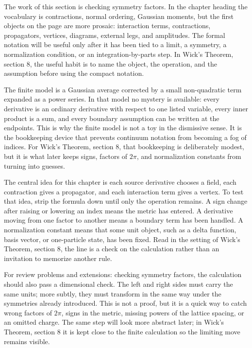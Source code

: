 The work of this section is checking symmetry factors.  In the chapter heading the vocabulary is contractions, normal ordering, Gaussian moments, but the first objects on the page are more prosaic: interaction terms, contractions, propagators, vertices, diagrams, external legs, and amplitudes.  The formal notation will be useful only after it has been tied to a limit, a symmetry, a normalization condition, or an integration-by-parts step.  In Wick's Theorem, section 8, the useful habit is to name the object, the operation, and the assumption before using the compact notation.

The finite model is a Gaussian average corrected by a small non-quadratic term expanded as a power series.  In that model no mystery is available: every derivative is an ordinary derivative with respect to one listed variable, every inner product is a sum, and every boundary assumption can be written at the endpoints.  This is why the finite model is not a toy in the dismissive sense.  It is the bookkeeping device that prevents continuum notation from becoming a fog of indices.  For Wick's Theorem, section 8, that bookkeeping is deliberately modest, but it is what later keeps signs, factors of \(2\pi\), and normalization constants from turning into guesses.

The central idea for this chapter is each source derivative chooses a field, each contraction gives a propagator, and each interaction term gives a vertex.  To test that idea, strip the formula down until only the operation remains.  A sign change after raising or lowering an index means the metric has entered.  A derivative moving from one factor to another means a boundary term has been handled.  A normalization constant means that some unit object, such as a delta function, basis vector, or one-particle state, has been fixed.  Read in the setting of Wick's Theorem, section 8, the line is a check on the calculation rather than an invitation to memorize another rule.

For review problems and extensions: checking symmetry factors, the calculation should also pass a dimensional check.  The left and right sides must carry the same units; more subtly, they must transform in the same way under the symmetries already introduced.  This is not a proof, but it is a quick way to catch wrong factors of \(2\pi\), signs in the metric, missing powers of the lattice spacing, or an omitted charge.  The same step will look more abstract later; in Wick's Theorem, section 8 it is kept close to the finite calculation so the limiting move remains visible.

